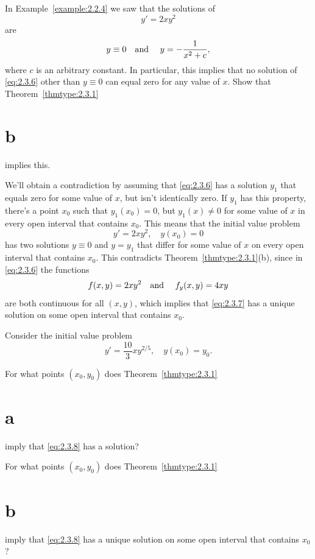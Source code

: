\begin{example}
  \label{example:2.3.4} \rm In Example~\ref{example:2.2.4} we saw that the solutions of
  \begin{equation}
    \label{eq:2.3.6}y'=2xy^{2}
  \end{equation}
  are
  \[
    y\equiv0\mbox{\quad and \quad}y=-\frac{1}{x^{2}+c},
  \]
  where $c$ is an arbitrary constant. In particular, this implies that no solution of
  \eqref{eq:2.3.6} other than $y\equiv0$ can equal zero for any value of $x$. Show that
  Theorem~\ref{thmtype:2.3.1}\part{b} implies this.
\end{example}

\begin{examplesolution}
\solution We'll obtain a contradiction by assuming that \eqref{eq:2.3.6} has a solution $y_{1}$ that
equals zero for some value of $x$, but isn't identically zero. If $y_{1}$ has this property, there's
a point $x_{0}$ such that $y_{1}(x_{0})=0$, but $y_{1}(x)\ne0$ for some value of $x$ in every open
interval that contains $x_{0}$. This means that the initial value problem
\begin{equation}
  \label{eq:2.3.7}y'=2xy^{2},\quad y(x_{0})=0
\end{equation}
has two solutions $y\equiv0$ and $y=y_{1}$ that differ for some value of $x$ on every open interval
that contains $x_{0}$. This contradicts Theorem~\ref{thmtype:2.3.1}(b), since in \eqref{eq:2.3.6}
the functions
\[
  f(x,y)=2xy^{2}\mbox{\quad and \quad}f_{y}(x,y)=4xy
\]
are both continuous for all $(x,y)$, which implies that \eqref{eq:2.3.7} has a unique solution on
some open interval that contains $x_{0}$.
\end{examplesolution}

\begin{example}
  \label{example:2.3.5} \rm Consider the initial value problem
  \begin{equation}
    \label{eq:2.3.8}y'=\frac{10}{3}xy^{2/5},\quad y(x_{0})=y_{0}.
  \end{equation}
  \begin{alist}
    \item %
    For what points $(x_{0},y_{0})$ does Theorem~\ref{thmtype:2.3.1}\part{a} imply that
    \eqref{eq:2.3.8} has a solution?

    \item %
    For what points $(x_{0},y_{0})$ does Theorem~\ref{thmtype:2.3.1}\part{b} imply that
    \eqref{eq:2.3.8} has a unique solution on some open interval that contains $x_{0}$?
  \end{alist}
\end{example}

